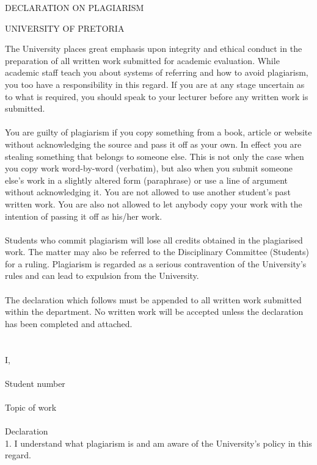 \newpage
\vspace*{\fill}
\begin{center}
DECLARATION ON PLAGIARISM

UNIVERSITY OF PRETORIA

\end{center}
The University places great emphasis upon integrity and ethical conduct in the preparation of all written work submitted for academic evaluation.
While academic staff teach you about systems of referring and how to avoid plagiarism, you too have a responsibility in this regard. If you are at any stage uncertain as to what is required, you should speak to your lecturer before any written work is submitted. \\ \\
You are guilty of plagiarism if you copy something from a book, article or website without acknowledging the source and pass it off as your own. In effect you are stealing something that belongs to someone else. This is not only the case when you copy work word-by-word (verbatim), but also when you submit someone else's work in a slightly altered form (paraphrase) or use a line of argument without acknowledging it. You are not allowed to use another student's past written work. You are also not allowed to let anybody copy your work with the intention of passing it off as his/her work. \\ \\
Students who commit plagiarism will lose all credits obtained in the plagiarised work. The matter may also be referred to the Disciplinary Committee (Students) for a ruling. Plagiarism is regarded as a serious contravention of the University's rules and can lead to expulsion from the University. \\ \\
The declaration which follows must be appended to all written work submitted within the department. No written work will be accepted unless the declaration has been completed and attached. \\ \\ \\
I, \authorname \\ \\
Student number \studentnumber \\ \\
Topic of work \doctitle \\ \\
Declaration \\
1.	I understand what plagiarism is and am aware of the University's policy in this regard. \\

